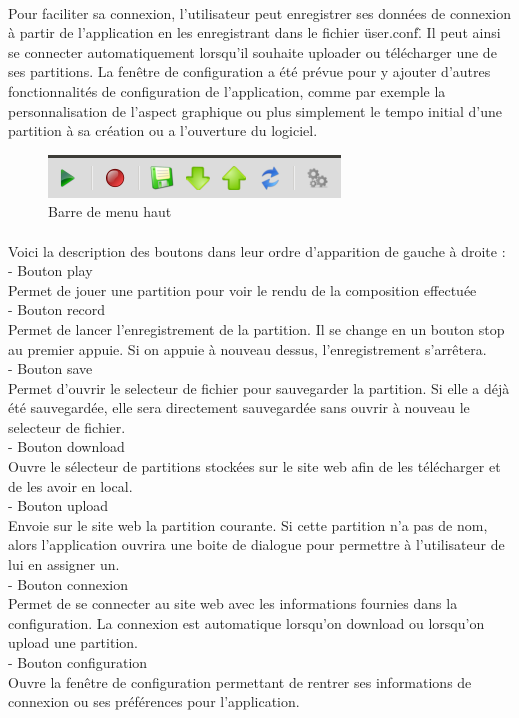 \paragraph{}
Pour faciliter sa connexion, l'utilisateur peut enregistrer ses données de connexion à partir de l'application en les enregistrant dans le fichier 
\"user.conf\". Il peut ainsi se connecter automatiquement lorsqu'il souhaite uploader ou télécharger une de ses partitions. La fenêtre de configuration 
a été prévue pour y ajouter d'autres fonctionnalités de configuration de l'application, comme par exemple la personnalisation de l'aspect graphique ou 
plus simplement le tempo initial d'une partition à sa création ou a l'ouverture du logiciel.

\begin{figure}[H]
\centering
\includegraphics[scale=0.5]{TopApp}
\caption{Barre de menu haut}
\end{figure}
\paragraph{}
Voici la description des boutons dans leur ordre d'apparition de gauche à droite :\\
- Bouton play\\
Permet de jouer une partition pour voir le rendu de la composition effectuée\\
- Bouton record\\
Permet de lancer l'enregistrement de la partition. Il se change en un bouton stop au premier appuie. Si on appuie à nouveau dessus, 
l'enregistrement s'arrêtera.\\
- Bouton save\\
Permet d'ouvrir le selecteur de fichier pour sauvegarder la partition. Si elle a déjà été sauvegardée, elle sera directement sauvegardée sans 
ouvrir à nouveau le selecteur de fichier.\\
- Bouton download\\
Ouvre le sélecteur de partitions stockées sur le site web afin de les télécharger et de les avoir en local.\\
- Bouton upload\\
Envoie sur le site web la partition courante. Si cette partition n'a pas de nom, alors l'application ouvrira une boite de dialogue pour permettre 
à l'utilisateur de lui en assigner un.\\
- Bouton connexion\\
Permet de se connecter au site web avec les informations fournies dans la configuration. La connexion est automatique lorsqu'on download 
ou lorsqu'on upload une partition.\\
- Bouton configuration\\
Ouvre la fenêtre de configuration permettant de rentrer ses informations de connexion ou ses préférences pour l'application.\\


